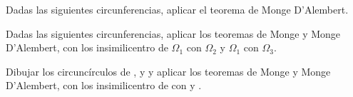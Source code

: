 \newpage
\begin{section-exercise}
    Dadas las siguientes circunferencias, aplicar el teorema de Monge D'Alembert.
    \vspace*{\fill}
    \begin{figure}[H]
        \centering
        
    \end{figure}
    \vspace*{\fill}
\end{section-exercise}

\newpage
\begin{section-exercise}
    Dadas las siguientes circunferencias, aplicar los teoremas de Monge y Monge D'Alembert, con los insimilicentro de $\Omega_1$ con $\Omega_2$ y $\Omega_1$ con $\Omega_3$.
    \vspace*{\fill}
    \begin{figure}[H]
        \centering
        
    \end{figure}
    \vspace*{\fill}
\end{section-exercise}

\newpage
\begin{section-exercise}
    Dibujar los circuncírculos de ,  y  y aplicar los teoremas de Monge y Monge D'Alembert, con los insimilicentro de  con  y .
    \vspace*{\fill}
    \begin{figure}[H]
        \centering
        
    \end{figure}
\end{section-exercise}